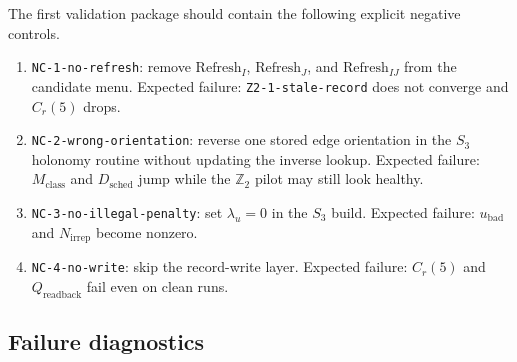 \documentclass[11pt]{article}
\begin{document}
The first validation package should contain the following explicit negative controls.
\begin{enumerate}[leftmargin=2em]
\item \texttt{NC-1-no-refresh}: remove $\mathrm{Refresh}_I$, $\mathrm{Refresh}_J$, and
$\mathrm{Refresh}_{IJ}$ from the candidate menu. Expected failure:
\texttt{Z2-1-stale-record} does not converge and $C_r(5)$ drops.
\item \texttt{NC-2-wrong-orientation}: reverse one stored edge orientation in the $S_3$ holonomy
routine without updating the inverse lookup. Expected failure: $M_{\mathrm{class}}$ and
$D_{\mathrm{sched}}$ jump while the $\mathbb Z_2$ pilot may still look healthy.
\item \texttt{NC-3-no-illegal-penalty}: set $\lambda_u=0$ in the $S_3$ build. Expected failure:
$u_{\mathrm{bad}}$ and $N_{\mathrm{irrep}}$ become nonzero.
\item \texttt{NC-4-no-write}: skip the record-write layer. Expected failure: $C_r(5)$ and
$Q_{\mathrm{readback}}$ fail even on clean runs.
\end{enumerate}

\subsection{Failure diagnostics}
\end{document}
